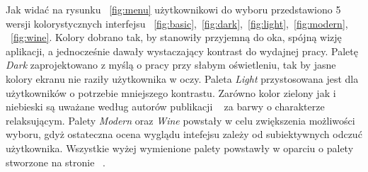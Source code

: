 \documentclass[twoside,a4paper]{book}
\begin{document}
 Jak widać na rysunku ~\ref{fig:menu} użytkownikowi  do wyboru przedstawiono 5 wersji kolorystycznych interfejsu ~\ref{fig:basic},~\ref{fig:dark},~\ref{fig:light},~\ref{fig:modern}, ~\ref{fig:wine}. 
 Kolory dobrano tak, by stanowiły przyjemną do oka, spójną wizję aplikacji, a jednocześnie dawały wystaczający kontrast do  wydajnej pracy. Paletę \textit{Dark} zaprojektowano z myślą o pracy przy słabym oświetleniu, tak by jasne kolory ekranu nie raziły użytkownika w oczy. Paleta \textit{Light} przystosowana jest dla użytkowników o potrzebie mniejszego kontrastu. Zarówno kolor zielony jak i niebieski są uważane według autorów publikacji ~\cite{uiColor} za barwy o charakterze relaksującym. Palety \textit{Modern} oraz \textit{Wine} powstały w celu zwiększenia możliwości wyboru, gdyż ostateczna ocena wyglądu intefejsu zależy od subiektywnych odczuć użytkownika. Wszystkie wyżej wymienione palety powstawły w oparciu o palety stworzone na stronie ~\cite{uiColorContrast}.
 
\end{document}
